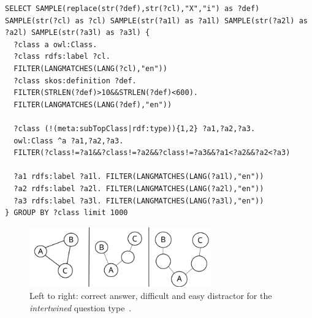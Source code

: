 \documentclass{IOS-Book-Article}     %
\newcommand{\citep}{\cite}%
\begin{document}
%
\begin{lstlisting}[float, caption=SPARQL query generating the key and distractors for the \emph{definition} questions., label=lst:sparql,basicstyle=\ttfamily\footnotesize,frame=single]
SELECT SAMPLE(replace(str(?def),str(?cl),"X","i") as ?def) SAMPLE(str(?cl) as ?cl) SAMPLE(str(?a1l) as ?a1l) SAMPLE(str(?a2l) as ?a2l) SAMPLE(str(?a3l) as ?a3l) {
  ?class a owl:Class.
  ?class rdfs:label ?cl.
  FILTER(LANGMATCHES(LANG(?cl),"en"))
  ?class skos:definition ?def.
  FILTER(STRLEN(?def)>10&&STRLEN(?def)<600).
  FILTER(LANGMATCHES(LANG(?def),"en"))
  
  ?class (!(meta:subTopClass|rdf:type)){1,2} ?a1,?a2,?a3.
  owl:Class ^a ?a1,?a2,?a3.
  FILTER(?class!=?a1&&?class!=?a2&&?class!=?a3&&?a1<?a2&&?a2<?a3)

  ?a1 rdfs:label ?a1l. FILTER(LANGMATCHES(LANG(?a1l),"en"))
  ?a2 rdfs:label ?a2l. FILTER(LANGMATCHES(LANG(?a2l),"en"))
  ?a3 rdfs:label ?a3l. FILTER(LANGMATCHES(LANG(?a3l),"en"))
} GROUP BY ?class limit 1000
\end{lstlisting}
%
%


\begin{figure}
\includegraphics[width=0.7\textwidth]{img/intertwined_cml.png} 
\caption{Left to right: correct answer, difficult and easy distractor for the \emph{intertwined} question type~\citep{snikquizba}.}
\label{fig:intertwined}
\end{figure}
\end{document}
